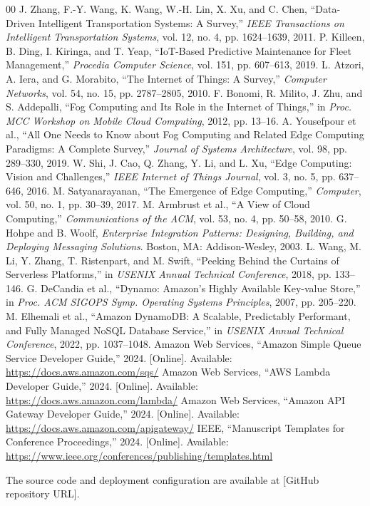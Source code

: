 \documentclass[conference]{IEEEtran}
\begin{document}
\begin{thebibliography}{00}
 J. Zhang, F.-Y. Wang, K. Wang, W.-H. Lin, X. Xu, and C. Chen, ``Data-Driven Intelligent Transportation Systems: A Survey,'' \emph{IEEE Transactions on Intelligent Transportation Systems}, vol. 12, no. 4, pp. 1624--1639, 2011.
 P. Killeen, B. Ding, I. Kiringa, and T. Yeap, ``IoT-Based Predictive Maintenance for Fleet Management,'' \emph{Procedia Computer Science}, vol. 151, pp. 607--613, 2019.
 L. Atzori, A. Iera, and G. Morabito, ``The Internet of Things: A Survey,'' \emph{Computer Networks}, vol. 54, no. 15, pp. 2787--2805, 2010.
 F. Bonomi, R. Milito, J. Zhu, and S. Addepalli, ``Fog Computing and Its Role in the Internet of Things,'' in \emph{Proc. MCC Workshop on Mobile Cloud Computing}, 2012, pp. 13--16.
 A. Yousefpour et al., ``All One Needs to Know about Fog Computing and Related Edge Computing Paradigms: A Complete Survey,'' \emph{Journal of Systems Architecture}, vol. 98, pp. 289--330, 2019.
 W. Shi, J. Cao, Q. Zhang, Y. Li, and L. Xu, ``Edge Computing: Vision and Challenges,'' \emph{IEEE Internet of Things Journal}, vol. 3, no. 5, pp. 637--646, 2016.
 M. Satyanarayanan, ``The Emergence of Edge Computing,'' \emph{Computer}, vol. 50, no. 1, pp. 30--39, 2017.
 M. Armbrust et al., ``A View of Cloud Computing,'' \emph{Communications of the ACM}, vol. 53, no. 4, pp. 50--58, 2010.
 G. Hohpe and B. Woolf, \emph{Enterprise Integration Patterns: Designing, Building, and Deploying Messaging Solutions}. Boston, MA: Addison-Wesley, 2003.
 L. Wang, M. Li, Y. Zhang, T. Ristenpart, and M. Swift, ``Peeking Behind the Curtains of Serverless Platforms,'' in \emph{USENIX Annual Technical Conference}, 2018, pp. 133--146.
 G. DeCandia et al., ``Dynamo: Amazon's Highly Available Key-value Store,'' in \emph{Proc. ACM SIGOPS Symp. Operating Systems Principles}, 2007, pp. 205--220.
 M. Elhemali et al., ``Amazon DynamoDB: A Scalable, Predictably Performant, and Fully Managed NoSQL Database Service,'' in \emph{USENIX Annual Technical Conference}, 2022, pp. 1037--1048.
 Amazon Web Services, ``Amazon Simple Queue Service Developer Guide,'' 2024. [Online]. Available: \url{https://docs.aws.amazon.com/sqs/}
 Amazon Web Services, ``AWS Lambda Developer Guide,'' 2024. [Online]. Available: \url{https://docs.aws.amazon.com/lambda/}
 Amazon Web Services, ``Amazon API Gateway Developer Guide,'' 2024. [Online]. Available: \url{https://docs.aws.amazon.com/apigateway/}
 IEEE, ``Manuscript Templates for Conference Proceedings,'' 2024. [Online]. Available: \url{https://www.ieee.org/conferences/publishing/templates.html}
\end{thebibliography}

The source code and deployment configuration are available at [GitHub repository URL].
\end{document}
